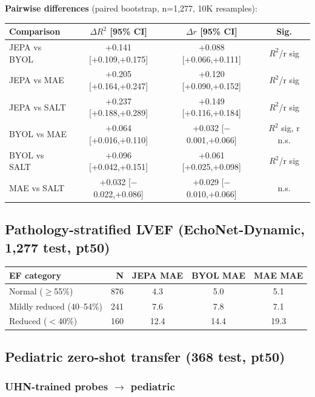 \documentclass{article}
\begin{document}
\textbf{Pairwise differences} (paired bootstrap, n=1{,}277, 10K resamples):

\begin{center}
\begin{tabular}{lccc}
\toprule
Comparison & $\Delta R^2$ [95\% CI] & $\Delta r$ [95\% CI] & Sig. \\
\midrule
JEPA vs BYOL & +0.141 [+0.109,+0.175] & +0.088 [+0.066,+0.111] & $R^2$/r sig \\
JEPA vs MAE  & +0.205 [+0.164,+0.247] & +0.120 [+0.090,+0.152] & $R^2$/r sig \\
JEPA vs SALT & +0.237 [+0.188,+0.289] & +0.149 [+0.116,+0.184] & $R^2$/r sig \\
BYOL vs MAE  & +0.064 [+0.016,+0.110] & +0.032 [$-$0.001,+0.066] & $R^2$ sig, r n.s. \\
BYOL vs SALT & +0.096 [+0.042,+0.151] & +0.061 [+0.025,+0.098] & $R^2$/r sig \\
MAE vs SALT  & +0.032 [$-$0.022,+0.086] & +0.029 [$-$0.010,+0.066] & n.s. \\
\bottomrule
\end{tabular}
\end{center}

\subsection{Pathology-stratified LVEF (EchoNet-Dynamic, 1{,}277 test, pt50)}

\begin{center}
\begin{tabular}{lrccc}
\toprule
EF category & N & JEPA MAE & BYOL MAE & MAE MAE \\
\midrule
Normal ($\geq$55\%) & 876 & 4.3 & 5.0 & 5.1 \\
Mildly reduced (40--54\%) & 241 & 7.6 & 7.8 & 7.1 \\
Reduced ($<$40\%) & 160 & 12.4 & 14.4 & 19.3 \\
\bottomrule
\end{tabular}
\end{center}

\subsection{Pediatric zero-shot transfer (368 test, pt50)}\label{sec:pediatric}

\subsubsection{UHN-trained probes $\to$ pediatric}
\end{document}
